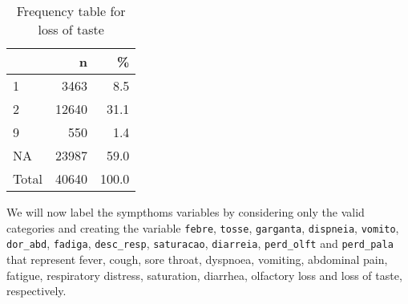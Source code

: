 \documentclass[
]{article}
\newenvironment{Shaded}{\begin{snugshade}}{\end{snugshade}}
\newcommand{\CommentTok}[1]{\textcolor[rgb]{0.56,0.35,0.01}{\textit{#1}}}
\newcommand{\DataTypeTok}[1]{\textcolor[rgb]{0.13,0.29,0.53}{#1}}
\newcommand{\DecValTok}[1]{\textcolor[rgb]{0.00,0.00,0.81}{#1}}
\newcommand{\KeywordTok}[1]{\textcolor[rgb]{0.13,0.29,0.53}{\textbf{#1}}}
\newcommand{\NormalTok}[1]{#1}
\newcommand{\OperatorTok}[1]{\textcolor[rgb]{0.81,0.36,0.00}{\textbf{#1}}}
\newcommand{\OtherTok}[1]{\textcolor[rgb]{0.56,0.35,0.01}{#1}}
\newcommand{\StringTok}[1]{\textcolor[rgb]{0.31,0.60,0.02}{#1}}
\begin{document}
\begin{Shaded}
\end{Shaded}

\begin{table}[!h]

\caption{\label{tab:unnamed-chunk-60}Frequency table for loss of taste}
\centering
\begin{tabular}[t]{l|r|r}
\hline
  & n & \%\\
\hline
1 & 3463 & 8.5\\
\hline
2 & 12640 & 31.1\\
\hline
9 & 550 & 1.4\\
\hline
NA & 23987 & 59.0\\
\hline
Total & 40640 & 100.0\\
\hline
\end{tabular}
\end{table}

We will now label the sympthoms variables by considering only the valid
categories and creating the variable \texttt{febre}, \texttt{tosse},
\texttt{garganta}, \texttt{dispneia}, \texttt{vomito},
\texttt{dor\_abd}, \texttt{fadiga}, \texttt{desc\_resp},
\texttt{saturacao}, \texttt{diarreia}, \texttt{perd\_olft} and
\texttt{perd\_pala} that represent fever, cough, sore throat, dyspnoea,
vomiting, abdominal pain, fatigue, respiratory distress, saturation,
diarrhea, olfactory loss and loss of taste, respectively.

\begin{Shaded}
\end{Shaded}
\end{document}
